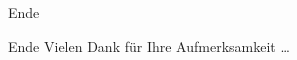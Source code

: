 \documentclass[mathserif,9pt]{beamer}
\begin{document}
    \section*{}
    \begin{frame}{Ende}
        \begin{block}{Ende}
            Vielen Dank für Ihre Aufmerksamkeit \ldots
        \end{block}
    \end{frame}

\end{document}
